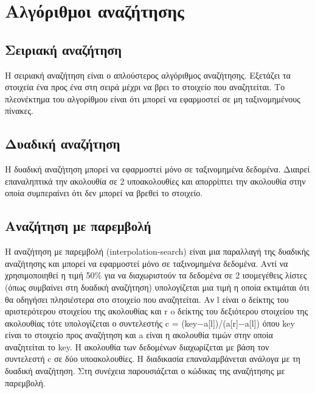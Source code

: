 




\section{Αλγόριθμοι αναζήτησης}

\subsection{Σειριακή αναζήτηση}
Η σειριακή αναζήτηση είναι ο απλούστερος αλγόριθμος αναζήτησης. Εξετάζει τα στοιχεία ένα προς ένα στη σειρά μέχρι να βρει το στοιχείο που αναζητείται. Το πλεονέκτημα του αλγορίθμου είναι ότι μπορεί να εφαρμοστεί σε μη ταξινομημένους πίνακες.





\subsection{Δυαδική αναζήτηση}
Η δυαδική αναζήτηση μπορεί να εφαρμοστεί μόνο σε ταξινομημένα δεδομένα. Διαιρεί επαναληπτικά την ακολουθία σε 2 υποακολουθίες και απορρίπτει την ακολουθία στην οποία συμπεραίνει ότι δεν μπορεί να βρεθεί το στοιχείο. 







\subsection{Αναζήτηση με παρεμβολή}
Η αναζήτηση με παρεμβολή (interpolation-search) είναι μια παραλλαγή της δυαδικής αναζήτησης και μπορεί να εφαρμοστεί μόνο σε ταξινομημένα δεδομένα. Αντί να χρησιμοποιηθεί η τιμή 50\% για να διαχωριστούν τα δεδομένα σε 2 ισομεγέθεις λίστες (όπως συμβαίνει στη δυαδική αναζήτηση) υπολογίζεται μια τιμή η οποία εκτιμάται ότι θα οδηγήσει πλησιέστερα στο στοιχείο που αναζητείται. Αν l είναι ο δείκτης του αριστερότερου στοιχείου της ακολουθίας και r o δείκτης του δεξιότερου στοιχείου της ακολουθίας τότε υπολογίζεται ο συντελεστής 
c = (key−a[l])/(a[r]−a[l]) όπου key είναι το στοιχείο προς αναζήτηση και a είναι η ακολουθία τιμών στην οποία αναζητείται το key. Η ακολουθία των δεδομένων διαχωρίζεται με βάση τον συντελεστή c σε δύο υποακολουθίες. Η διαδικασία επαναλαμβάνεται ανάλογα με τη δυαδική αναζήτηση. Στη συνέχεια παρουσιάζεται ο κώδικας της αναζήτησης με παρεμβολή.

